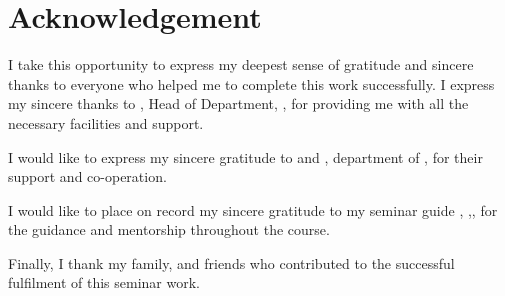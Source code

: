 \chapter*{\centering Acknowledgement}%
%


I take this opportunity to express my deepest sense of gratitude and sincere
thanks to everyone who helped me to complete this work successfully. I express
my sincere thanks to \textbf{ \hod}, Head of Department, \dept,
\college\hspace*{2pt} \collegeplace \hspace*{2pt} for providing me with all the
necessary facilities and support.

I would like to express my sincere gratitude to \textbf{\semcordinatorA} and
\textbf{\semcordinatorB}, department of \hspace*{2pt} \dept, \hspace*{2pt}
\college \hspace*{2pt} \collegeplace \hspace*{2pt} for their support and
co-operation. %

I would like to place on record my sincere gratitude to my seminar guide
\textbf{\guide},
\hspace*{2pt}\guidedes,\hspace*{2pt}\dept,\hspace*{2pt}\college \hspace*{2pt}
for the guidance and mentorship throughout the course.

Finally, I thank my family, and friends who contributed to the successful
fulfilment of this seminar work.

\vspace*{30pt}
\begin{flushright}
    \textbf{\author}
\end{flushright}
\thispagestyle{plain}
